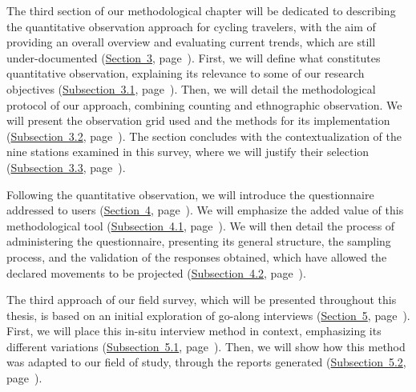 \begin{refsegment}
The third section of our methodological chapter will be dedicated to describing the quantitative observation approach for cycling travelers, with the aim of providing an overall overview and evaluating current trends, which are still under-documented (\hyperref[chap3:observation-quantitative]{Section~3}, page~\pageref{chap3:observation-quantitative}). First, we will define what constitutes quantitative observation, explaining its relevance to some of our research objectives (\hyperref[chap3:observation-quantitative-outil-adapte]{Subsection~3.1}, page~\pageref{chap3:observation-quantitative-outil-adapte}). Then, we will detail the methodological protocol of our approach, combining counting and ethnographic observation. We will present the observation grid used and the methods for its implementation (\hyperref[chap3:methodologie-observation-quantitative]{Subsection~3.2}, page~\pageref{chap3:methodologie-observation-quantitative}). The section concludes with the contextualization of the nine stations examined in this survey, where we will justify their selection (\hyperref[chap3:observation-quantitative-gares-examinees]{Subsection~3.3}, page~\pageref{chap3:observation-quantitative-gares-examinees}).%

Following the quantitative observation, we will introduce the questionnaire addressed to users (\hyperref[chap3:questionnaire]{Section~4}, page~\pageref{chap3:questionnaire}). We will emphasize the added value of this methodological tool (\hyperref[chap3:apports-questionnaire-usagers]{Subsection~4.1}, page~\pageref{chap3:apports-questionnaire-usagers}). We will then detail the process of administering the questionnaire, presenting its general structure, the sampling process, and the validation of the responses obtained, which have allowed the declared movements to be projected (\hyperref[chap3:administration-questionnaire-usagers]{Subsection~4.2}, page~\pageref{chap3:administration-questionnaire-usagers}).%

The third approach of our field survey, which will be presented throughout this thesis, is based on an initial exploration of go-along interviews (\hyperref[chap3:parcours-commente]{Section~5}, page~\pageref{chap3:parcours-commente}). First, we will place this in-situ interview method in context, emphasizing its different variations (\hyperref[chap3:parcours-commente-definition]{Subsection~5.1}, page~\pageref{chap3:parcours-commente-definition}). Then, we will show how this method was adapted to our field of study, through the  reports generated (\hyperref[chap3:parcours-commente-administration-participants]{Subsection~5.2}, page~\pageref{chap3:parcours-commente-administration-participants}).%


\end{refsegment}
